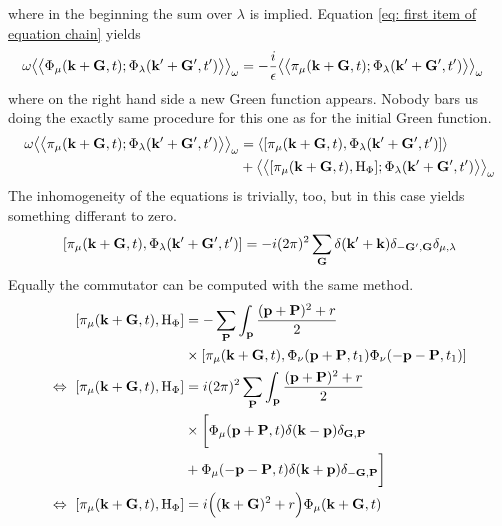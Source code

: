 %
where in the beginning the sum over $\lambda$ is implied.
Equation \eqref{eq: first item of equation chain} yields
%
\begin{align}
	\omega \green{\Phi_{\mu}(\vb{k}+\vb{G},t)}{\Phi_{\lambda}(\vb{k}'+\vb{G}',t')}_{\omega} &= 
		-\frac{i}{\epsilon} \green{\pi_{\mu}(\vb{k}+\vb{G},t)}{\Phi_{\lambda}(\vb{k}'+\vb{G}',t')}_{\omega}
\end{align}
%
where on the right hand side a new Green function appears.
Nobody bars us doing the exactly same procedure for this one as for the initial Green function.
%
\begin{align}
	\omega \green{\pi_{\mu}(\vb{k}+\vb{G},t)}{\Phi_{\lambda}(\vb{k}'+\vb{G}',t')}_{\omega} &= 
		\expval{\comm{\pi_{\mu}(\vb{k}+\vb{G},t)}{\Phi_{\lambda}(\vb{k}'+\vb{G}',t')}}
		\notag \\ &+
		\green{\comm{\pi_{\mu}(\vb{k}+\vb{G},t)}{\mt{H}_{\Phi}}}{\Phi_{\lambda}(\vb{k}'+\vb{G}',t')}_{\omega}
	\label{eq: second item of equation chain}
\end{align}
%
The inhomogeneity of the equations is trivially, too, but in this case yields something differant to zero.
%
\begin{align}
	\comm{\pi_{\mu}(\vb{k}+\vb{G},t)}{\Phi_{\lambda}(\vb{k}'+\vb{G}',t')} = -i (2\pi)^{2} \sum\limits_{\vb{G}} \delta(\vb{k}'+\vb{k}) \delta_{-\vb{G}',\vb{G}} \delta_{\mu,\lambda}
\end{align}
%
Equally the commutator can be computed with the same method.
%
\begin{align}
	\comm{\pi_{\mu}(\vb{k}+\vb{G},t)}{\mt{H}_{\Phi}} &= 
		-\sum\limits_{\vb{P}} 
		\int_{\vb{p}}
		\frac{(\vb{p}+\vb{P})^{2} + r}{2}
		\notag \\ &\times
		\comm{\pi_{\mu}(\vb{k}+\vb{G},t)}{\Phi_{\nu}(\vb{p}+\vb{P},t_{1}) \Phi_{\nu}(-\vb{p}-\vb{P},t_{1})}
	\notag \\
	\Leftrightarrow\ \comm{\pi_{\mu}(\vb{k}+\vb{G},t)}{\mt{H}_{\Phi}} &= 
		i(2\pi)^{2} \sum\limits_{\vb{P}} 
		\int_{\vb{p}}
		\frac{(\vb{p}+\vb{P})^{2} + r}{2} 
		\notag \\ &\times\bigg[
			\Phi_{\mu}(\vb{p}+\vb{P},t) \delta(\vb{k}-\vb{p}) \delta_{\vb{G},\vb{P}}
			\notag \\& 
			+
			\Phi_{\mu}(-\vb{p}-\vb{P},t) \delta(\vb{k}+\vb{p}) \delta_{-\vb{G},\vb{P}}
		\bigg]
	\notag \\
	\Leftrightarrow\ \comm{\pi_{\mu}(\vb{k}+\vb{G},t)}{\mt{H}_{\Phi}} &= 
		i \Big( (\vb{k}+\vb{G})^{2} + r \Big) \Phi_{\mu}(\vb{k}+\vb{G},t)
\end{align}
